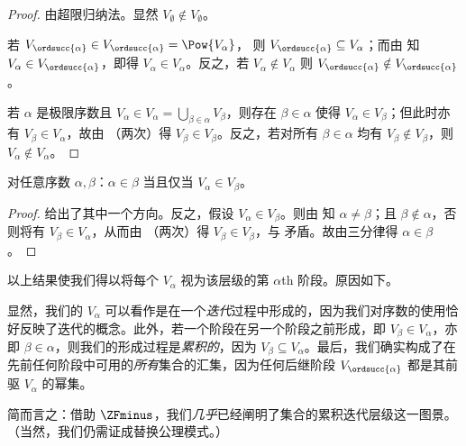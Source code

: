 \documentclass[../../../include/open-logic-section]{subfiles}
\begin{document}
\begin{proof}
由超限归纳法。显然 $V_\emptyset \notin V_\emptyset$。

若 $V_{\ordsucc{\alpha}} \in V_{\ordsucc{\alpha}} = \Pow{V_\alpha}$，
则 $V_{\ordsucc{\alpha}} \subseteq V_\alpha$；而由  知 $V_\alpha
\in V_{\ordsucc{\alpha}}$，即得 $V_\alpha \in V_\alpha$。反之，若 $V_\alpha \notin V_\alpha$
则 $V_{\ordsucc{\alpha}} \notin V_{\ordsucc{\alpha}}$。

若 $\alpha$ 是极限序数且 $V_\alpha \in V_\alpha = \bigcup_{\beta \in
\alpha}V_\beta$，则存在 $\beta \in \alpha$ 使得 $V_\alpha \in V_\beta$；但此时亦有 $V_\beta \in V_\alpha$，故由 （两次）得 $V_\beta \in
V_\beta$。反之，若对所有 $\beta \in \alpha$ 均有 $V_\beta \notin
V_\beta$，则 $V_\alpha \notin V_\alpha$。
\end{proof}

\begin{cor}
对任意序数 $\alpha, \beta$：$\alpha \in \beta$ 当且仅当 $V_\alpha \in V_\beta$。
\end{cor}

\begin{proof}
 给出了其中一个方向。反之，假设 $V_\alpha \in V_\beta$。则由  知 $\alpha \neq \beta$；且 $\beta \notin \alpha$，否则将有 $V_\beta \in V_\alpha$，从而由 （两次）得 $V_\beta \in V_\beta$，与  矛盾。故由三分律得 $\alpha \in \beta$。
\end{proof}
\noindent
以上结果使我们得以将每个 $V_\alpha$ 视为该层级的第 $\alpha$th
阶段。原因如下。

显然，我们的 $V_\alpha$ 可以看作是在一个\emph{迭代}过程中形成的，因为我们对序数的使用恰好反映了迭代的概念。此外，若一个阶段在另一个阶段之前形成，即 $V_\beta \in V_\alpha$，亦即 $\beta \in \alpha$，则我们的形成过程是\emph{累积的}，因为 $V_\beta \subseteq V_\alpha$。最后，我们确实构成了在先前任何阶段中可用的\emph{所有}集合的汇集，因为任何后继阶段
$V_{\ordsucc{\alpha}}$ 都是其前驱 $V_\alpha$ 的幂集。

简而言之：借助 $\ZFminus$，我们\emph{几乎}已经阐明了集合的累积迭代层级这一图景。（当然，我们仍需证成替换公理模式。）
\end{document}
